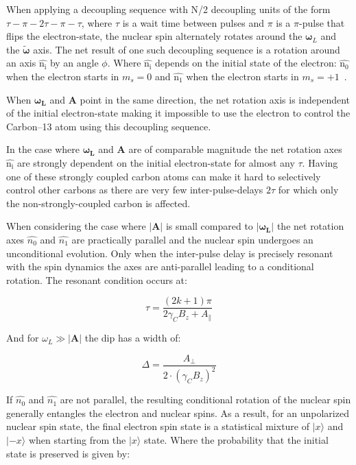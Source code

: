 When applying a decoupling sequence with N\slash 2 decoupling units of the form {$\tau - \pi -2\tau-\pi-\tau$}, where $\tau$ is a wait time between pulses and $\pi$ is a $\pi$-pulse that flips the electron-state, the nuclear spin alternately rotates around the  $\bm\omega_L$ and the $\bm{\tilde{\omega}}$ axis. The net result of one such decoupling sequence is a rotation around an axis $\bm{\hat{\mathrm{n_i}}}$ by an angle $\phi$. Where $\bm{\hat{\mathrm{n_i}}}$ depends on the initial state of the electron: $\bm{\hat{\mathrm{n_0}}}$ when the electron starts in $m_s = 0$ and $\bm{\hat{\mathrm{n_1}}}$ when the electron starts in $m_s = +1$~\citep{Taminiau2012Detection}.

When $\bm{\omega_L}$ and $\bm{A}$ point in the same direction, the net rotation axis is independent of the initial electron-state making it impossible to use the electron to control the Carbon--13 atom using this decoupling sequence.

In the case where $\bm{\omega_L}$ and $\bm{A}$ are of comparable magnitude the net rotation axes $\bm{\hat{\mathrm{n_i}}}$ are strongly dependent on the initial electron-state for almost any $\tau$. Having one of these strongly coupled carbon atoms can make it hard to selectively control other carbons as there are very few inter-pulse-delays $2\tau$ for which only the non-strongly-coupled carbon is affected.

When considering the case where $\bm{|A|}$ is small compared to  $\bm{|\omega_L|}$ the net rotation axes  $\hat{n_0}$ and $\hat{n_1}$ are practically parallel and the nuclear spin undergoes an unconditional evolution. Only when the inter-pulse delay is precisely resonant with the spin dynamics the axes are anti-parallel leading to a conditional rotation\citep{Taminiau2012Detection}. The resonant condition occurs at:

 \begin{equation}
\tau = \frac{(2k+1)\pi}{2 \gamma_C B_z + A_\parallel}
\label{eq:res_dip_loc}
\end{equation}

And for $\omega_L \gg |\bm{A}|$ the dip has a width of:

 \begin{equation}
\Delta = \frac{A_\perp}{2\cdot (\gamma_C B_z)^2}
\label{eq:res_dip_width}
\end{equation}

If  $\hat{n_0}$ and $\hat{n_1}$ are not parallel, the resulting conditional rotation of the nuclear spin generally entangles the electron and nuclear spins. As a result, for an unpolarized nuclear spin state, the final electron spin state is a statistical mixture of $|x\rangle$ and $|-x\rangle$ when starting from the $|x\rangle$  state. Where the probability that the initial state is preserved is given by:

